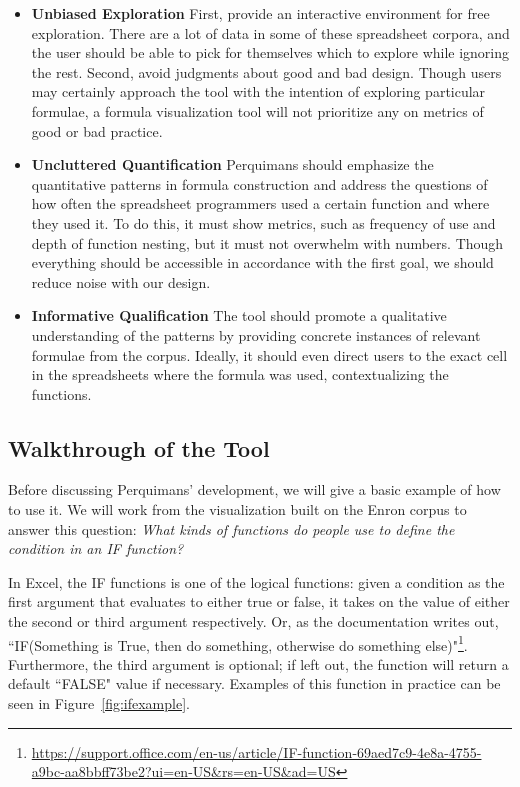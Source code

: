 \documentclass[conference]{IEEEtran}
\newcommand{\toolname}{Perquimans\xspace} \newcommand{\toolnameend}{Perquimans}
\newcommand{\toolnameposs}{Perquimans' }
\begin{document}
	\begin{itemize}
		
		\item [1] \textbf{Unbiased Exploration} First, provide an interactive
		environment for free exploration. There are a lot of data in some of these
		spreadsheet corpora, and the user should be able to pick for themselves which
		to explore while ignoring the rest. Second, avoid judgments about good and bad
		design. Though users may certainly approach the tool with the intention of
		exploring particular formulae, a formula visualization tool will not
		prioritize any on metrics of good or bad practice.
		
		\item [2] \textbf{Uncluttered Quantification} \toolname should emphasize the
		quantitative patterns in formula construction and address the questions of how
		often the spreadsheet programmers used a certain function and where they used
		it. To do this, it must show metrics, such as frequency of use and depth of
		function nesting, but it must not overwhelm with numbers. Though everything
		should be accessible in accordance with the first goal, we should reduce noise with our design.
		
		\item [3] \textbf{Informative Qualification} The tool should promote a qualitative understanding of the patterns by providing concrete instances of relevant
		formulae from the corpus. Ideally, it should even direct users to the exact
		cell in the spreadsheets where the formula was used, contextualizing the
		functions.
		
	\end{itemize}
	
	\subsection{Walkthrough of the Tool} \label{sec:walkthrough}Before discussing
	\toolnameposs development, we will give a basic example of how to use
	it. We will work from the visualization built on the Enron
	corpus to answer this question: \textit{ What kinds of functions do people use
		to define the condition in an IF function?}
	
	In Excel, the IF functions is one of the logical functions: given a condition
	as the first argument that evaluates to either true or false, it takes on the
	value of either the second or third argument respectively. Or, as the
	documentation writes out, ``IF(Something is True, then do something, otherwise
	do something
	else)"\footnote{\url{https://support.office.com/en-us/article/IF-function-69aed7c9-4e8a-4755-a9bc-aa8bbff73be2?ui=en-US\&rs=en-US\&ad=US}}. Furthermore, the third argument is optional; if left out, the function will return a default ``FALSE" value if necessary. Examples of this function in practice can be seen in Figure~\ref{fig:ifexample}.
	
\end{document}
